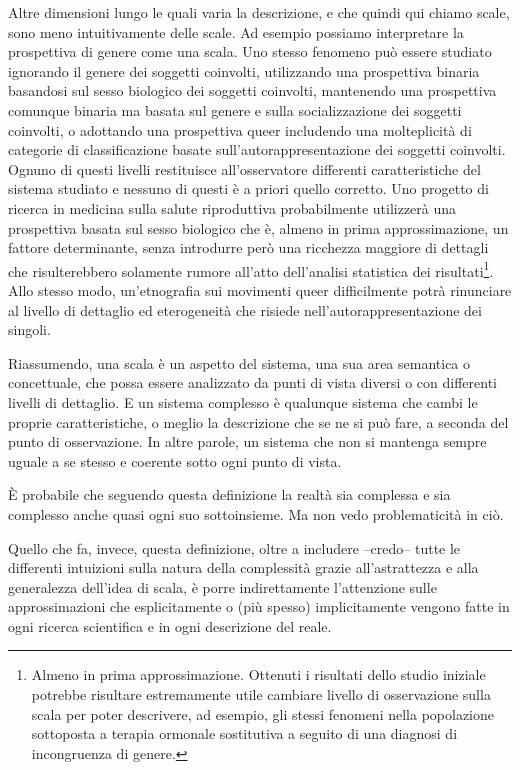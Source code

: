 \documentclass[a4paper, headings=standardclasses]{scrartcl}
\begin{document}
Altre dimensioni lungo le quali varia la descrizione, e che quindi qui chiamo scale, sono meno intuitivamente delle scale.
Ad esempio possiamo interpretare la prospettiva di genere come una scala.
Uno stesso fenomeno può essere studiato ignorando il genere dei soggetti coinvolti, utilizzando una prospettiva binaria basandosi sul sesso biologico dei soggetti coinvolti, mantenendo una prospettiva comunque binaria ma basata sul genere e sulla socializzazione dei soggetti coinvolti, o adottando una prospettiva queer includendo una molteplicità di categorie di classificazione basate sull'autorappresentazione dei soggetti coinvolti.
Ognuno di questi livelli restituisce all'osservatore differenti caratteristiche del sistema studiato e nessuno di questi è a priori quello corretto.
Uno progetto di ricerca in medicina sulla salute riproduttiva probabilmente utilizzerà una prospettiva basata sul sesso biologico che è, almeno in prima approssimazione, un fattore determinante, senza introdurre però una ricchezza maggiore di dettagli che risulterebbero solamente rumore all'atto dell'analisi statistica dei risultati\footnote{Almeno in prima approssimazione. Ottenuti i risultati dello studio iniziale potrebbe risultare estremamente utile cambiare livello di osservazione sulla scala per poter descrivere, ad esempio, gli stessi fenomeni nella popolazione sottoposta a terapia ormonale sostitutiva a seguito di una diagnosi di incongruenza di genere.}.
Allo stesso modo, un'etnografia sui movimenti queer difficilmente potrà rinunciare al livello di dettaglio ed eterogeneità che risiede nell'autorappresentazione dei singoli.

Riassumendo, una scala è un aspetto del sistema, una sua area semantica o concettuale, che possa essere analizzato da punti di vista diversi o con differenti livelli di dettaglio.
E un sistema complesso è qualunque sistema che cambi le proprie caratteristiche, o meglio la descrizione che se ne si può fare, a seconda del punto di osservazione. In altre parole, un sistema che non si mantenga sempre uguale a se stesso e coerente sotto ogni punto di vista.

È probabile che seguendo questa definizione la realtà sia complessa e sia complesso anche quasi ogni suo sottoinsieme. Ma non vedo problematicità in ciò.

Quello che fa, invece, questa definizione, oltre a includere --credo-- tutte le differenti intuizioni sulla natura della complessità grazie all'astrattezza e alla generalezza dell'idea di scala, è porre indirettamente l'attenzione sulle approssimazioni che esplicitamente o (più spesso) implicitamente vengono fatte in ogni ricerca scientifica e in ogni descrizione del reale.
\end{document}
